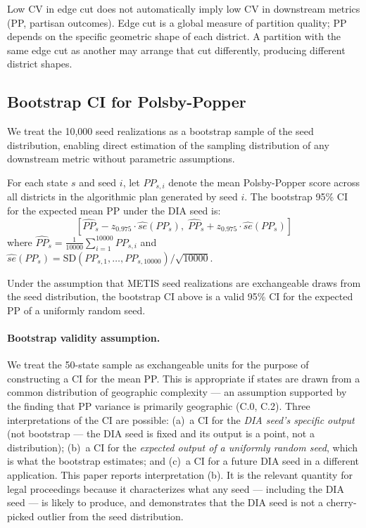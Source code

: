 Low CV in edge cut does not automatically imply low CV in downstream
metrics (PP, partisan outcomes). Edge cut is a global measure of
partition quality; PP depends on the specific geometric shape of each
district. A partition with the same edge cut as another may arrange
that cut differently, producing different district shapes.

\subsection{Bootstrap CI for Polsby-Popper}

We treat the 10,000 seed realizations as a bootstrap sample of the
seed distribution, enabling direct estimation of the sampling
distribution of any downstream metric without parametric assumptions.

For each state $s$ and seed $i$, let $PP_{s,i}$ denote the mean
Polsby-Popper score across all districts in the algorithmic plan
generated by seed $i$. The bootstrap 95\% CI for the expected mean
PP under the DIA seed is:
\begin{equation}
  \left[\hat{PP}_s - z_{0.975} \cdot \widehat{se}(PP_s),\;
        \hat{PP}_s + z_{0.975} \cdot \widehat{se}(PP_s)\right]
\end{equation}
where $\hat{PP}_s = \frac{1}{10000}\sum_{i=1}^{10000} PP_{s,i}$
and $\widehat{se}(PP_s) = \text{SD}(PP_{s,1}, \ldots, PP_{s,10000}) / \sqrt{10000}$.

\begin{proposition}
Under the assumption that METIS seed realizations are exchangeable
draws from the seed distribution, the bootstrap CI above is a valid
95\% CI for the expected PP of a uniformly random seed.
\end{proposition}

\paragraph{Bootstrap validity assumption.}
We treat the 50-state sample as exchangeable units for the purpose of
constructing a CI for the mean PP. This is appropriate if states are
drawn from a common distribution of geographic complexity --- an
assumption supported by the finding that PP variance is primarily
geographic (C.0, C.2). Three interpretations of the CI are possible:
(a)~a CI for the \emph{DIA seed's specific output} (not bootstrap ---
the DIA seed is fixed and its output is a point, not a distribution);
(b)~a CI for the \emph{expected output of a uniformly random seed},
which is what the bootstrap estimates; and (c)~a CI for a future DIA
seed in a different application. This paper reports interpretation
(b). It is the relevant quantity for legal proceedings because it
characterizes what any seed --- including the DIA seed --- is likely
to produce, and demonstrates that the DIA seed is not a cherry-picked
outlier from the seed distribution.

